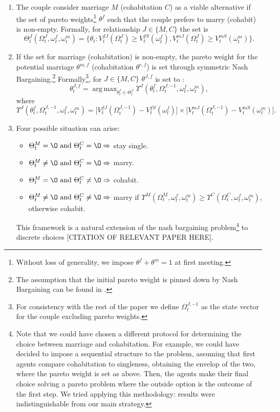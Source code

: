 \documentclass[12pt]{article}
\numberwithin{table}{section}
\DeclareMathOperator*{\argmax}{arg\,max}
\begin{document}
\begin{enumerate}
\item The couple consider marriage $M$ (cohabitation $C$) as a viable alternative if the set of pareto weights\footnote{Without loss of generality, we impose $\theta^f+\theta^m=1$ at first meeting.} $\theta^f$ such that the couple prefers to marry (cohabit) is non-empty. Formally, for relationship $J\in\{M,C\}$ the set is
\begin{equation}\label{eq:set_couple}
\Theta^J_t(\Omega^J_t,\omega^f_t,\omega^m_t)=\big\{\theta_t: V_t^{fJ}(\Omega^J_t)\geq V_t^{fS}(\omega^f_t), V_t^{mJ}(\Omega^J_t)\geq V_t^{mS}(\omega^m_t)\big\}.
\end{equation}
\item If the set for marriage (cohabitation) is non-empty, the pareto weight for the potential marriage $\theta^{m,f}$ (cohabitation $\theta^{c,f}$) is set through symmetric Nash Bargaining.\footnote{The assumption that the initial pareto weight is pinned down by Nash Bargaining can be found in \cite{low2018}.} Formally\footnote{For consistency with the rest of the paper we define $\Omega^{J,-1}_t$ as the state vector for the couple excluding pareto weights.}, for $J\in\{M,C\}$ $\theta^{J,f}$ is set to :
\begin{equation}\label{nash_couple}
\theta^{J,f}_t= \argmax_{\theta^f_t\in\Theta^J_t} \Upsilon^J(\theta^f_t,\Omega^{J,-1}_t,\omega^f_t,\omega^m_t),
\end{equation}
where
\begin{equation}
\Upsilon^J(\theta^f_t,\Omega^{J,-1}_t,\omega^f_t,\omega^m_t)=\big[V_t^{fJ}(\Omega^{J,-1}_t)- V_t^{fS}(\omega^f_t)\big]\times\big[ V_t^{mJ}(\Omega^{J,-1}_t)- V_t^{mS}(\omega^m_t)\big].
\end{equation}
\item Four possible situation can arise:
\begin{itemize}
\item $\Theta^M_t=\O\text{ and }\Theta^C_t=\O \Rightarrow$ stay single.
\item $\Theta^M_t\neq\O\text{ and }\Theta^C_t=\O \Rightarrow$ marry.
\item $\Theta^M_t=\O\text{ and }\Theta^C_t\neq\O \Rightarrow$ cohabit.
\item $\Theta^M_t\neq\O\text{ and }\Theta^C_t\neq\O \Rightarrow$ marry if $ \Upsilon^M(\Omega^M_t,\omega^f_t,\omega^m_t)\geq\Upsilon^C(\Omega^C_t,\omega^f_t,\omega^m_t)$, otherwise cohabit.
\end{itemize}
This framework is a natural extension of the nash bargaining problem\footnote{Note that we could have chosen a different protocol for determining the choice between marriage and cohabitation. For example, we could have decided to impose a sequential structure to the problem, assuming that first agents compare cohabitation to singleness, obtaining the envelop of the two, where the pareto weight is set as above. Then, the agents make their final choice solving a pareto problem where the outside option is the outcome of the first step. We tried applying this methodology: results were indistinguishable from our main strategy.} to discrete choices [CITATION OF RELEVANT PAPER HERE].
\end{enumerate}
\end{document}
